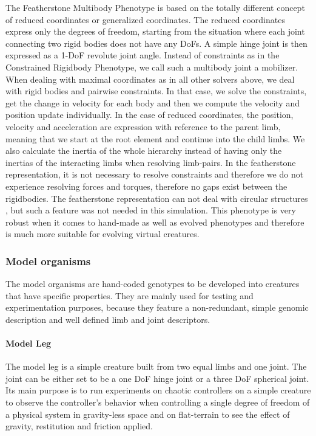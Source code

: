 \documentclass[main]{subfiles}
\begin{document}
The Featherstone Multibody Phenotype is based on the totally different concept of reduced coordinates or generalized coordinates. The reduced coordinates express only the degrees of freedom, starting from the situation where each joint connecting two rigid bodies does not have any DoFs. A simple hinge joint is then expressed as a 1-DoF revolute joint angle. Instead of constraints as in the Constrained Rigidbody Phenotype, we call such a multibody joint a mobilizer. When dealing with maximal coordinates as in all other solvers above, we deal with rigid bodies and pairwise constraints. In that case, we solve the constraints, get the change in velocity for each body and then we compute the velocity and position update individually. In the case of reduced coordinates, the position, velocity and acceleration are expression with reference to the parent limb, meaning that we start at the root element and continue into the child limbs. We also calculate the inertia of the whole hierarchy instead of having only the inertias of the interacting limbs when resolving limb-pairs. In the featherstone representation, it is not necessary to resolve constraints and therefore we do not experience resolving forces and torques, therefore no gaps exist between the rigidbodies. The featherstone representation can not deal with circular structures \cite{bib::Coumans2014}, but such a feature was not needed in this simulation. This phenotype is very robust when it comes to hand-made as well as evolved phenotypes and therefore is much more suitable for evolving virtual creatures. 

\subsubsection{Model organisms}

The model organisms are hand-coded genotypes to be developed into creatures that have specific properties. They are mainly used for testing and experimentation purposes, because they feature a non-redundant, simple genomic description and well defined limb and joint descriptors.

\paragraph{Model Leg}

The model leg is a simple creature built from two equal limbs and one joint. The joint can be either set to be a one DoF hinge joint or a three DoF spherical joint. Its main purpose is to run experiments on chaotic controllers on a simple creature to observe the controller's behavior when controlling a single degree of freedom of a physical system in gravity-less space and on flat-terrain to see the effect of gravity, restitution and friction applied.
\end{document}
